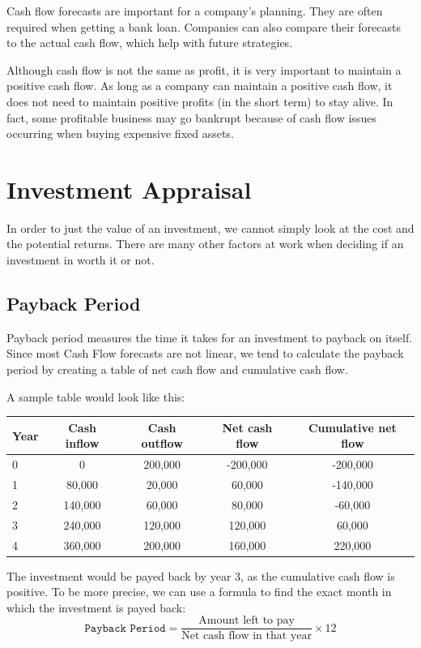 \documentclass{standalone}
\begin{document}
Cash flow forecasts are important for a company's planning.
They are often required when getting a bank loan.
Companies can also compare their forecasts to the actual cash flow, which help with future strategies.

Although cash flow is not the same as profit, it is very important to maintain a positive cash flow.
As long as a company can maintain a positive cash flow, it does not need to maintain positive profits (in the short term) to stay alive.
In fact, some profitable business may go bankrupt because of cash flow issues occurring when buying expensive fixed assets.

\section{Investment Appraisal}
In order to just the value of an investment, we cannot simply look at the cost and the potential returns.
There are many other factors at work when deciding if an investment in worth it or not.

\subsection{Payback Period}
Payback period measures the time it takes for an investment to payback on itself.
Since most Cash Flow forecasts are not linear, we tend to calculate the payback period by creating a table of net cash flow and cumulative cash flow.

A sample table would look like this:
\begin{tabular}{l c c c c}
    Year & Cash inflow & Cash outflow & Net cash flow & Cumulative net flow \\
    \hline
    0    & 0           & 200,000      & -200,000      & -200,000 \\
    1    & 80,000      & 20,000       & 60,000        & -140,000 \\
    2    & 140,000     & 60,000       & 80,000        & -60,000 \\
    3    & 240,000     & 120,000      & 120,000       & 60,000 \\
    4    & 360,000     & 200,000      & 160,000       & 220,000 \\
\end{tabular}

The investment would be payed back by year 3, as the cumulative cash flow is positive.
To be more precise, we can use a formula to find the exact month in which the investment is payed back:
\begin{equation}
    \texttt{Payback Period} = \frac{\textrm{Amount left to pay}}{\textrm{Net cash flow in that year}} \times 12
\end{equation}
\end{document}
